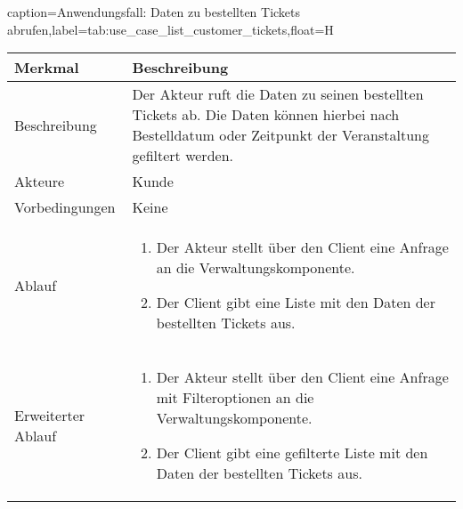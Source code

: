 \begin{dhbwtable}{caption={Anwendungsfall: Daten zu bestellten Tickets abrufen},label=tab:use_case_list_customer_tickets,float=H}
    \begin{tabularx}{\textwidth}{lX}
        \toprule
        \textbf{Merkmal} & \textbf{Beschreibung}  \\ \midrule
        Beschreibung    & Der Akteur ruft die Daten zu seinen bestellten Tickets ab. Die Daten können hierbei nach Bestelldatum oder Zeitpunkt der Veranstaltung gefiltert werden. \\
        Akteure         & Kunde \\
        Vorbedingungen  & Keine \\
        Ablauf          & \begin{minipage}[t]{\linewidth}
        \vspace*{-3mm}
        \begin{enumerate}[leftmargin=*,nosep,after=\strut]
            \item Der Akteur stellt über den Client eine Anfrage an die Verwaltungskomponente.
            \item Der Client gibt eine Liste mit den Daten der bestellten Tickets aus.
        \end{enumerate}
        \end{minipage} \\
        Erweiterter Ablauf & \begin{minipage}[t]{\linewidth}
            \vspace*{-3mm}
            \begin{enumerate}[leftmargin=*,nosep,after=\strut]
                \item Der Akteur stellt über den Client eine Anfrage mit Filteroptionen an die Verwaltungskomponente.
                \item Der Client gibt eine gefilterte Liste mit den Daten der bestellten Tickets aus.
            \end{enumerate}
            \end{minipage} \\\bottomrule
    \end{tabularx}    
\end{dhbwtable}

